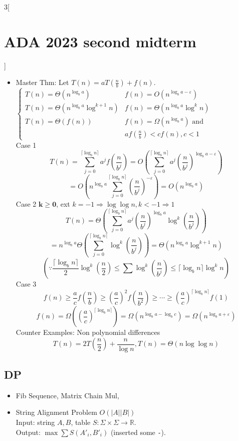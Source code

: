 \documentclass[10pt,a4paper]{report}
\newcommand{\ve}{\varepsilon}
\begin{document}
\begin{multicols}{3}[\section*{ADA 2023 second midterm}]
\begin{itemize}
    \item Master Thm: Let $T(n) = a T(\frac n b) + f(n)$. \\
    $\begin{cases}
      T(n) = \Theta(n^{\log_ba}) & f(n) = O(n^{\log_ba-\ve}) \\
      T(n) = \Theta(n^{\log_ba}\log^{k+1} n) & f(n) = \Theta(n^{\log_ba}\log^k n) \\
      T(n) = \Theta(f(n)) & f(n) = \Omega(n^{\log_ba}) \text{ and}\\
      & a f(\frac n b) < c f(n), c < 1
    \end{cases}$ \\
    Case 1
      \[ T(n) = \sum_{j=0}^{\lceil\log_b n\rceil} a^jf\left(\frac{n}{b^j}\right) = O\left(\sum_{j=0}^{\lceil\log_b n\rceil} a^j\left(\frac{n}{b^j}\right)^{\log_ba-\ve}\right) \]
      \[ = O\left(n^{\log_ba}\sum_{j=0}^{\lceil\log_b n\rceil} \left(\frac{n}{b^j}\right)^{-\ve}\right) = O\left(n^{\log_ba}\right) \]
    Case 2 $\boxed{\mathbf k \geq \mathbf 0}$, ext $k = -1 \Rightarrow \log \log n, k < -1 \Rightarrow 1$
      \[ T(n) = \Theta\left(\sum_{j=0}^{\lceil\log_b n\rceil} a^j\left(\frac{n}{b^j}\right)^{\log_ba}\log^k\left(\frac{n}{b^j}\right)\right) \]
      \[ = n^{\log_ba} \Theta\left(\sum_{j=0}^{\lceil\log_b n\rceil}\log^k\left(\frac{n}{b^j}\right)\right) =  \Theta(n^{\log_ba}\log^{k+1}n) \]
      \[ \left(\because\frac{\lceil\log_b n\rceil}{2} \log^k(\frac n 2) \leq \sum\log^k\left(\frac{n}{b^j}\right) \leq \lceil\log_b n\rceil\log^kn \right) \]
    Case 3
      \[ f(n) \geq \frac{a}{c}f\left(\frac{n}{b}\right) \geq \left(\frac{a}{c}\right)^2f\left(\frac{n}{b^2}\right) \geq \cdots \geq \left(\frac{a}{c}\right)^{\lceil\log_b n\rceil}f(1) \]
      \[ f(n) = \Omega\left(\left(\frac{a}{c}\right)^{\lceil\log_b n\rceil}\right) = \Omega\left(n^{\log_ba - \log_bc}\right) = \Omega\left(n^{\log_ba + \ve}\right) \]
    Counter Examples: Non polynomial differences
     \[ T(n) = 2T\left(\frac n 2\right) + \frac{n}{\log n}, T(n) = \Theta (n \log \log n) \]

  \end{itemize}

\subsection*{DP}
\begin{itemize} 
  \item Fib Sequence, Matrix Chain Mul,
  \item String Alignment Problem $O(|A||B|)$ \\
        Input: string $A, B$, table $S: \Sigma \times \Sigma \rightarrow \mathbb R$. \\
        Output: $\max \sum S(A'_i, B'_i)$ (inserted some \texttt{-}).
\end{itemize}


\end{multicols}
\end{document}
